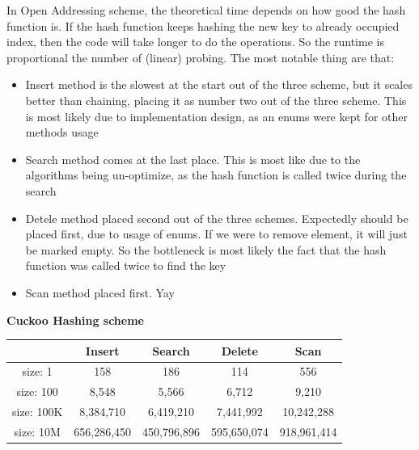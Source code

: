 \documentclass{article} %
\begin{document}
    In Open Addressing scheme, the theoretical time depends on how good the hash function is.
    If the hash function keeps hashing the new key to already occupied index, then the code will take longer to do the operations.
    So the runtime is proportional the number of (linear) probing.
    The most notable thing are that:
    \begin{itemize}
        \item Insert method is the slowest at the start out of the three scheme, but it scales better than chaining, placing it as number two out of the three scheme.
        This is most likely due to implementation design, as an enums were kept for other methods usage
        \item Search method comes at the last place.
        This is most like due to the algorithms being un-optimize, as the hash function is called twice during the search
        \item Detele method placed second out of the three schemes.
        Expectedly should be placed first, due to usage of enums.
        If we were to remove element, it will just be marked empty.
        So the bottleneck is most likely the fact that the hash function was called twice to find the key
        \item Scan method placed first.
        Yay
    \end{itemize}

    \textbf{Cuckoo Hashing scheme}
    \begin{center}
        \begin{tabular}{|c|c|c|c|c|}\hline
        & Insert & Search & Delete & Scan\\\hline
        size: 1 & 158 & 186 & 114 & 556\\\hline
        size: 100 & 8,548 & 5,566 & 6,712 & 9,210\\\hline
        size: 100K & 8,384,710 & 6,419,210 & 7,441,992 & 10,242,288\\\hline
        size: 10M & 656,286,450 & 450,796,896 & 595,650,074 & 918,961,414\\\hline
        \end{tabular}
    \end{center}
\end{document}
